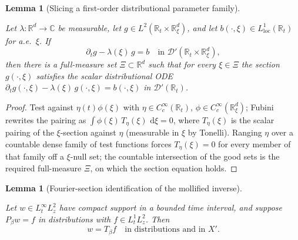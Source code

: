 \documentclass[11pt,oneside]{book}
\providecommand{\uses}[1]{}
\newtheorem{lemma}[theorem]{Lemma}
\theoremstyle{definition}
\theoremstyle{remark}
\newcommand{\R}{\mathbb R}
\newcommand{\C}{\mathbb C}
\newcommand{\D}{\mathcal D}
\newcommand{\1}{\mathbf 1}
\newcommand{\loc}{\mathrm{loc}}
\newcommand{\dd}{\,\mathrm d}
\begin{document}
\begin{lemma}[Slicing a first-order distributional parameter family]\label{lem:parameterwise-distribution-ODE}
\uses{def:conjugated-operator}
Let $\lambda:\R^d\to\C$ be measurable, let $g\in L^2(\R_t\times\R^d_\xi)$, and let
$b(\cdot,\xi)\in L^1_{\loc}(\R_t)$ for a.e.\ $\xi$. If
\[
 \partial_t g-\lambda(\xi)\,g=b\quad\text{in }\D'(\R_t\times\R^d_\xi),
\]
then there is a full-measure set $\Xi\subset\R^d$ such that for every $\xi\in\Xi$ the section
$g(\cdot,\xi)$ satisfies the scalar distributional ODE
$\partial_t g(\cdot,\xi)-\lambda(\xi)\,g(\cdot,\xi)=b(\cdot,\xi)$ in $\D'(\R_t)$.
\end{lemma}

\begin{proof}
\uses{}
Test against $\eta(t)\phi(\xi)$ with $\eta\in C_c^\infty(\R_t)$, $\phi\in C_c^\infty(\R^d_\xi)$;
Fubini rewrites the pairing as $\int\phi(\xi)\,T_\eta(\xi)\,\dd\xi=0$, where $T_\eta(\xi)$ is the
scalar pairing of the $\xi$-section against $\eta$ (measurable in $\xi$ by Tonelli). Ranging
$\eta$ over a countable dense family of test functions forces $T_\eta(\xi)=0$ for every member of
that family off a $\xi$-null set; the countable intersection of the good sets is the required
full-measure $\Xi$, on which the section equation holds.
\end{proof}

\begin{lemma}[Fourier-section identification of the mollified inverse]\label{lem:fourier-section-identification}
\uses{def:conjugated-operator, def:carleman-spaces, def:Tbeta}
Let $w\in L^\infty_tL^2_z$ have compact support in a bounded time interval, and suppose
$P_\beta w=f$ in distributions with $f\in L^1_tL^2_z$. Then
\begin{equation}
 w=T_\beta f\quad\text{in distributions and in }X'. \label{eq:section-Tbeta}
\end{equation}
\end{lemma}
\end{document}
